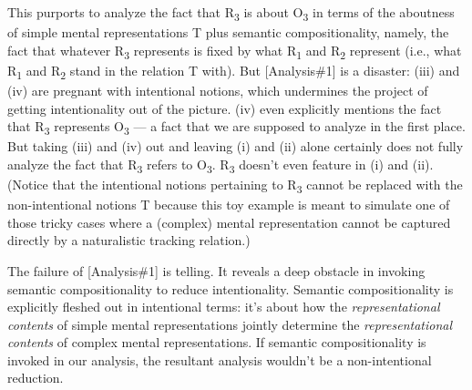 \documentclass[a4paper,12pt]{article}
\begin{document}
This purports to analyze the fact that R\textsubscript{3} is about O\textsubscript{3} in terms of the aboutness of simple mental representations T plus semantic compositionality, namely, the fact that whatever R\textsubscript{3} represents is fixed by what R\textsubscript{1} and R\textsubscript{2} represent (i.e., what R\textsubscript{1} and R\textsubscript{2} stand in the relation T with). But [Analysis\#1] is a disaster: (iii) and (iv) are pregnant with intentional notions, which undermines the project of getting intentionality out of the picture. (iv) even explicitly mentions the fact that R\textsubscript{3} represents O\textsubscript{3} --- a fact that we are supposed to analyze in the first place. But taking (iii) and (iv) out and leaving (i) and (ii) alone certainly does not fully analyze the fact that R\textsubscript{3} refers to O\textsubscript{3}. R\textsubscript{3} doesn't even feature in (i) and (ii). (Notice that the intentional notions pertaining to R\textsubscript{3} cannot be replaced with the non-intentional notions T because this toy example is meant to simulate one of those tricky cases where a (complex) mental representation cannot be captured directly by a naturalistic tracking relation.)

The failure of [Analysis\#1] is telling. It reveals a deep obstacle in invoking semantic compositionality to reduce intentionality. Semantic compositionality is explicitly fleshed out in intentional terms: it's about how the \emph{representational contents} of simple mental representations jointly determine the \emph{representational contents} of complex mental representations. If semantic compositionality is invoked in our analysis, the resultant analysis wouldn't be a non-intentional reduction.\footnotemark

\end{document}
